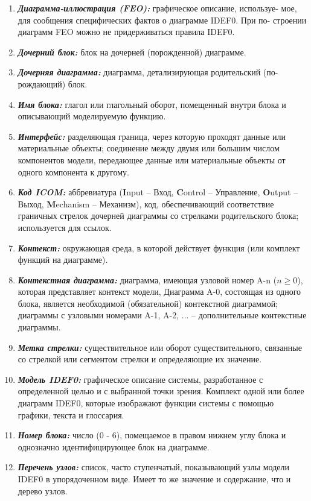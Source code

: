 \documentclass[a4paper, final]{article}
\begin{document}
\begin{enumerate}
  \item \textbf{\textit{Диаграмма-иллюстрация (FEO):}} графическое описание, используе-
  мое, для сообщения специфических фактов о диаграмме IDEF0. При по-
  строении диаграмм FEO можно не придерживаться правила IDEF0.
  \item \textbf{\textit{Дочерний блок:}} блок на дочерней (порожденной) диаграмме.
  \item \textbf{\textit{Дочерняя диаграмма:}} диаграмма, детализирующая родительский (по-
  рождающий) блок.
  \item \textbf{\textit{Имя блока:}} глагол или глагольный оборот, помещенный внутри блока
  и описывающий моделируемую функцию.
  \item \textbf{\textit{Интерфейс:}} разделяющая граница, через которую проходят данные
  или материальные объекты; соединение между двумя или большим числом компонентов модели, передающее данные или материальные объекты от одного компонента к другому.
  \item \textbf{\textit{Код ICOM:}} аббревиатура (\textbf{I}nput -- Вход, \textbf{C}ontrol -- Управление, \textbf{O}utput -- Выход, \textbf{M}echanism -- Механизм), код, обеспечивающий соответствие граничных стрелок дочерней диаграммы со стрелками родительского блока; используется для ссылок.
  \item \textbf{\textit{Контекст:}} окружающая среда, в которой действует функция (или комплект функций на диаграмме).
  \item \textbf{\textit{Контекстная диаграмма:}} диаграмма, имеющая узловой номер A-n (\textbf{$n \geq 0$}), которая представляет контекст модели, Диаграмма A-0, состоящая из одного блока, является необходимой (обязательной) контекстной диаграммой; диаграммы с узловыми номерами A-1, A-2, ... -- дополнительные контекстные диаграммы.
  \item \textbf{\textit{Метка стрелки:}} существительное или оборот существительного, связанные со стрелкой или сегментом стрелки и определяющие их значение.
  \item \textbf{\textit{Модель IDEF0:}} графическое описание системы, разработанное с определенной целью и с выбранной точки зрения. Комплект одной или более диаграмм IDEF0, которые изображают функции системы с помощью графики, текста и глоссария.
  \item \textbf{\textit{Номер блока:}} число (0 - 6), помещаемое в правом нижнем углу блока и однозначно идентифицирующее блок на диаграмме.
  \item \textbf{\textit{Перечень узлов:}} список, часто ступенчатый, показывающий узлы модели IDEF0 в упорядоченном виде. Имеет то же значение и содержание, что и дерево узлов.

\end{enumerate}
\end{document}
